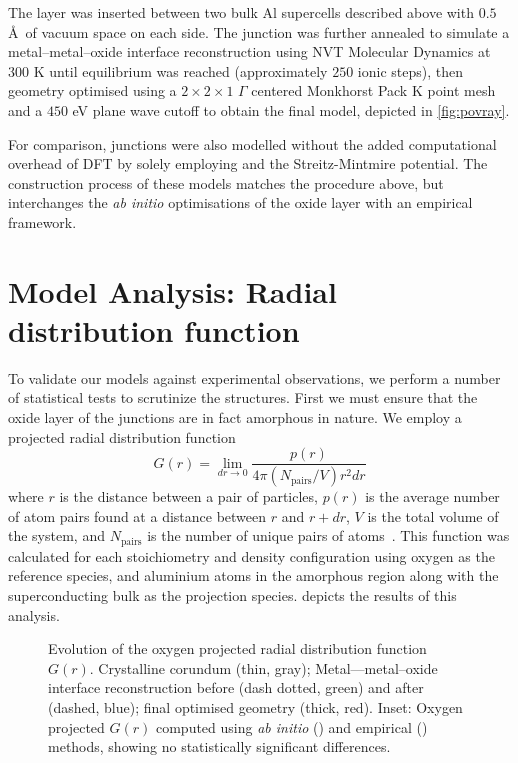 The  layer was inserted between two bulk Al supercells described above with $0.5$ \AA\ of vacuum space on each side.
The junction was further annealed to simulate a metal--metal--oxide interface reconstruction using  NVT Molecular Dynamics at $300$ K until equilibrium was reached (approximately $250$ ionic steps), then geometry optimised using a $2\!\times\!2\!\times\!1$ $\Gamma$ centered Monkhorst Pack K point mesh and a $450$ eV plane wave cutoff to obtain the final model, depicted in \cref{fig:povray}.

For comparison, junctions were also modelled without the added computational overhead of DFT by solely employing  and the Streitz-Mintmire potential.
The construction process of these models matches the procedure above, but interchanges the \textit{ab initio} optimisations of the oxide layer with an empirical framework.

\section{Model Analysis{\rmfamily :} Radial distribution function}
To validate our models against experimental observations, we perform a number of statistical tests to scrutinize the structures.
First we must ensure that the oxide layer of the junctions are in fact amorphous in nature.
We employ a projected radial distribution function
\begin{equation}
G(r) = \lim_{dr \to 0}\frac{p(r)}{4\pi\left(N_{\mathrm{pairs}}/V\right)r^2dr}
\end{equation}
where $r$ is the distance between a pair of particles, $p(r)$ is the average number of atom pairs found at a distance between $r$ and $r + dr$, $V$ is the total volume of the system, and $N_{\mathrm{pairs}}$ is the number of unique pairs of atoms~\cite{Levine2011}.
This function was calculated for each stoichiometry and density configuration using oxygen as the reference species, and aluminium atoms in the amorphous region along with the superconducting bulk as the projection species.  depicts the results of this analysis.

\begin{figure}[tbh]
\centering
\caption{\label{fig:groptis}Evolution of the oxygen projected radial distribution function $G(r)$. Crystalline corundum (thin, gray); Metal---metal--oxide interface reconstruction before (dash dotted, green) and after (dashed, blue); final optimised geometry (thick, red).  Inset: Oxygen projected $G(r)$ computed using \textit{ab initio}
 () and empirical () methods, showing no statistically significant differences.}%
\end{figure}

